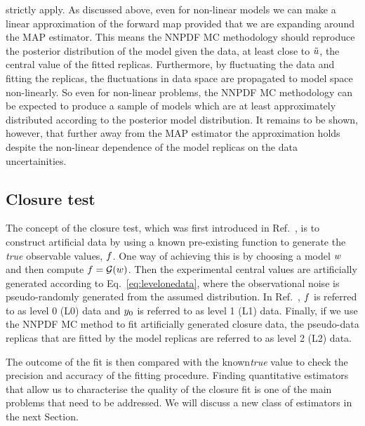strictly apply. As discussed above,
even for non-linear models we can make a linear approximation of the forward map
provided that we are expanding around the MAP estimator. This means the NNPDF MC
methodology should reproduce the posterior distribution of the model given the
data, at least close to $\tilde{u}$, the central value of the fitted replicas.
Furthermore, by fluctuating the data and fitting the replicas, the fluctuations
in data space are propagated to model space non-linearly. So even for non-linear
problems, the NNPDF MC methodology can be expected to produce a sample of models which are at
least approximately distributed according to the posterior model distribution.
It remains to be shown, however,
that further away from the MAP estimator the approximation holds
despite the non-linear dependence of the model replicas on the data
uncertainities.

\subsection{Closure test}
\label{sec:closure-test-intro}

The concept of the closure test, which was first introduced in
Ref.~\cite{nnpdf30}, is to construct artificial data by using a known
pre-existing function to generate the {\em true} observable values, $f$. One
way of achieving this is by choosing a model $w$ and then compute $f
= \mathcal{G}(w)$. Then the experimental central values are artificially
generated according to Eq.~\ref{eq:levelonedata}, where the observational noise
is pseudo-randomly generated from the assumed distribution. In
Ref.~\cite{nnpdf30}, $f$ is referred to as level 0 (L0) data and
$y_0$ is referred to as level 1 (L1) data. Finally, if we use the
NNPDF MC method to fit artificially generated closure data, the pseudo-data
replicas that are fitted by the model replicas are referred to as level 2 (L2)
data.

The outcome of the fit is then compared with the known{\em true} value to check
the precision and accuracy of the fitting procedure. Finding quantitative
estimators that allow us to characterise the quality of the closure fit is one
of the main problems that need to be addressed. We will discuss a new class of
estimators in the next Section. 

